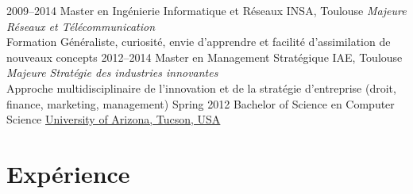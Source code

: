 \documentclass[]{friggeri-cv} %
\begin{document}
\begin{entrylist}
\entry
{2009--2014}
{Master {\normalfont en Ingénierie Informatique et Réseaux}}
{INSA, Toulouse}
{\emph{Majeure Réseaux et Télécommunication}\\
Formation Généraliste, curiosité, envie d'apprendre et facilité d'assimilation de nouveaux concepts
\vspace{.2cm}}
\entry
{2012--2014}
{Master {\normalfont en Management Stratégique}}
{IAE, Toulouse}
{\emph{Majeure Stratégie des industries innovantes}\\
Approche multidisciplinaire de l'innovation et de la stratégie d'entreprise (droit, finance, marketing, management)
\vspace{.2cm}}
\entry
{Spring 2012}
{Bachelor of Science {\normalfont en Computer Science}}
{\ul{University of Arizona, Tucson, USA}}
{\vspace{-10pt}}
\end{entrylist}


\section{Expérience}
\end{document}
